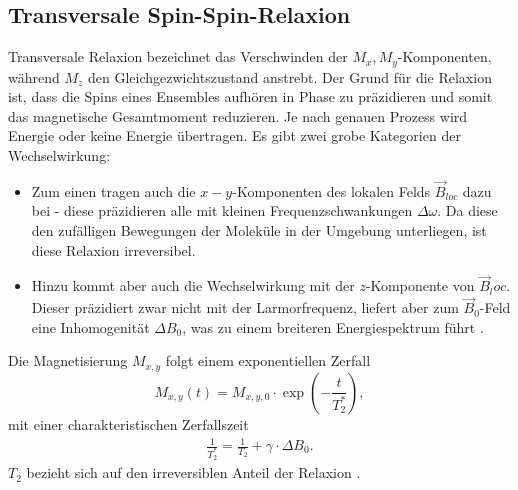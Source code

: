 \documentclass[../main.tex]{subfiles}
\begin{document}
\subsection{Transversale Spin-Spin-Relaxion}
    Transversale Relaxion bezeichnet das Verschwinden der $M_x,M_y$-Komponenten, während $M_z$ den Gleichgezwichtszustand anstrebt. Der Grund für die Relaxion ist, dass die Spins eines Ensembles aufhören in Phase zu präzidieren und somit das magnetische Gesamtmoment reduzieren. Je nach genauen Prozess wird Energie oder keine Energie übertragen. Es gibt zwei grobe Kategorien der Wechselwirkung:
    \begin{itemize}
        \item Zum einen tragen auch die $x-y$-Komponenten des lokalen Felds $\vec{B}_{loc}$ dazu bei - diese präzidieren alle mit kleinen Frequenzschwankungen $\Delta\omega$. Da diese den zufälligen Bewegungen der Moleküle in der Umgebung unterliegen, ist diese Relaxion irreversibel.
        \item Hinzu kommt aber auch die Wechselwirkung mit der $z$-Komponente von $\vec{B}_loc$. Dieser präzidiert zwar nicht mit der Larmorfrequenz, liefert aber zum $\vec{B}_0$-Feld eine Inhomogenität $\Delta B_0$, was zu einem breiteren Energiespektrum führt \cite[p.2]{PhysRev.110.65}.
    \end{itemize}
    Die Magnetisierung $M_{x,y}$ folgt einem exponentiellen Zerfall
    \[
        M_{x,y}(t) = M_{x,y,0}\cdot\exp(-\frac{t}{T_2^*}),
    \]
    mit einer charakteristischen Zerfallszeit
    \begin{align*}
        \frac{1}{T_2^*} = \frac{1}{T_2} + \gamma\cdot\Delta B_0.
    \end{align*}
    $T_2$ bezieht sich auf den irreversiblen Anteil der Relaxion \cite[p.41]{doc:EFNMRStudentManual}.
\end{document}
